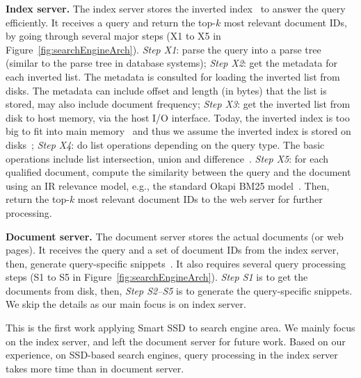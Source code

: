 \textbf{Index server.} The index server stores the inverted index~\cite{ZM06} to answer the query efficiently. It receives a query and return the top-$k$ most relevant document IDs, by going through several major steps (X1 to X5 in Figure~\ref{fig:searchEngineArch}).
\textit{Step X1}: parse the query into a parse tree (similar to the parse tree in database systems);
\textit{Step X2}: get the metadata for each inverted list. The metadata is consulted for loading the inverted list from disks. The metadata can include offset and length (in bytes) that the list is stored, may also include document frequency;
\textit{Step X3}: get the inverted list from disk to host memory, via the host I/O interface. Today, the inverted index is too big to fit into main memory~\cite{BaezaYates07ICDE,Risvik2013} and thus we assume the inverted index is stored on disks~\cite{Ruyue2010,Wang2013ISS};
\textit{Step X4}: do list operations depending on the query type. The basic operations include list intersection, union and difference~\cite{M08,GoogleAdv}.
\textit{Step X5}: for each qualified document, compute the similarity between the query and the document using an IR relevance model, e.g., the standard Okapi BM25 model~\cite{Robertson1994}. Then, return the top-$k$ most relevant document IDs to the web server for further processing.

\textbf{Document server.} The document server stores the actual documents (or web pages). It receives the query and a set of document IDs from the index server, then, generate query-specific snippets~\cite{Turpin2007FGR}. %
It also requires several query processing steps (S1 to S5 in Figure~\ref{fig:searchEngineArch}). \emph{Step S1} is to get the documents from disk, then, \emph{Step S2--S5} is to generate the query-specific snippets. We skip the details as our main focus is on index server.

This is the first work applying Smart SSD to search engine area. We mainly focus on the index server, and left the document server for future work. Based on our experience, on SSD-based search engines, query processing in the index server takes more time than in document server. 